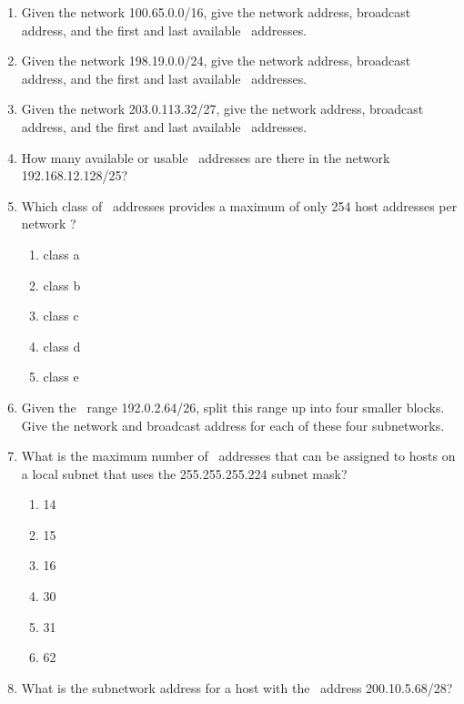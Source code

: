 \begin{enumerate}
\item
   Given the network 100.65.0.0/16, give the network address, broadcast address, and the first and last available \IP\ addresses.
\item
   Given the network 198.19.0.0/24, give the network address, broadcast address, and the first and last available \IP\ addresses.
\item
   Given the network 203.0.113.32/27, give the network address, broadcast address, and the first and last available \IP\ addresses.
\item
   How many available or usable \IP\ addresses are there in the network 192.168.12.128/25?
\item
   Which class of \IP\ addresses provides a maximum of only 254 host addresses per network ?
   \begin{multicols}{2}
   \raggedcolumns
   \begin{enumerate}
   \item class a
   \item class b
   \item class c
   \item class d
   \item class e
   \end{enumerate}
   \end{multicols}
\item
   Given the \IP\ range 192.0.2.64/26, split this range up into four smaller blocks.
   Give the network and broadcast address for each of these four subnetworks.
\item
   What is the maximum number of \IP\ addresses that can be assigned to hosts on a local subnet that uses the 255.255.255.224 subnet mask?
   \begin{multicols}{2}
   \begin{enumerate}
   \item 14
   \item 15
   \item 16
   \item 30
   \item 31
   \item 62
   \end{enumerate}
   \end{multicols}
\item
   What is the subnetwork address for a host with the \IP\ address 200.10.5.68/28?
   \begin{multicols}{2}
   \begin{enumerate}

\end{enumerate}
\end{multicols}
\end{enumerate}
